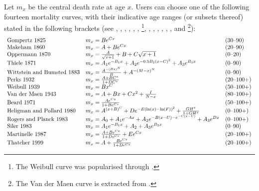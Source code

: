Let \(m_x\) be the central death rate at age \(x\). Users can choose one of the following fourteen mortality curves, with their indicative age ranges (or subsets thereof) stated in the following brackets (see \citet{Gompertz1825}, \citet{Makeham1860}, \citet{Oppermann1870}, \citet{Thiele1871}, \citet{Wittstein1883}, \citet{Perks1932}, \citet{Weibull1951}\footnote{The Weibull curve was popularised through \citet{Weibull1951}.}, \citet{Beard1971}, \citet{Heligman1980}, \citet{Rogers1983}, \citet{Siler1983}, \citet{Martinelle1987}, \citet{Thatcher1999}, and \citet{Tabeau2001}\footnote{The Van der Maen curve is extracted from \citet{Tabeau2001}.}):
\[
\begin{array}{l l l}
\text{Gompertz 1825} & m_x = B e^{Cx} & (30\text{--}90) \\
\text{Makeham 1860} & m_x = A + B e^{Cx} & (20\text{--}90) \\
\text{Oppermann 1870} & m_x = \frac{A}{\sqrt{x+1}} + B + C\sqrt{x+1} & (0\text{--}20) \\
\text{Thiele 1871} & m_x = A_1 e^{-B_1 x} + A_2 e^{-0.5 B_2 (x-C)^2} + A_3 e^{B_3 x} & (0\text{--}90) \\
\text{Wittstein and Bumsted 1883} & m_x = \frac{A^{-(Bx)^N}}{B} + A^{-(M-x)^N} & (0\text{--}90) \\ 
\text{Perks 1932} & m_x = \frac{A+BC^x}{1+DC^x} & (20\text{--}100+) \\
\text{Weibull 1939} & m_x = Bx^C & (50\text{--}100+) \\
\text{Van der Maen 1943} & m_x = A + Bx + Cx^2 + \frac{I}{N-x} & (80\text{--}100+) \\
\text{Beard 1971} & m_x = \frac{A e^{Cx}}{1+B e^{Cx}} & (50\text{--}100+) \\ 
\text{Heligman and Pollard 1980} & m_x = A^{(x+B)^C} + D e^{-E(\ln(x)-\ln(F))^2} + \frac{GH^x}{1+GH^x} & (0\text{--}100+) \\
\text{Rogers and Planck 1983} & m_x = A_0 + A_1 e^{-Ax} + A_2 e^{-B(x-U)-e^{-C(x-U)}} + A_3 e^{Dx} & (0\text{--}100+) \\
\text{Siler 1983} & m_x = A_1 e^{-B_1 x} + A_2 + A_3 e^{B_3 x} & (0\text{--}90) \\
\text{Martinelle 1987} & m_x = \frac{A+B e^{Cx}}{1+D e^{Cx}} + E e^{Cx} & (20\text{--}100+) \\
\text{Thatcher 1999} & m_x = A + \frac{B e^{Cx}}{1+D e^{Cx}} & (20\text{--}100+) \\
\end{array}
\]

